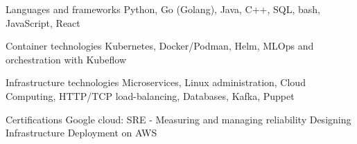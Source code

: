 \vspace{-0.5cm}

\begin{cvskills}

  \cvskill
    {Languages and frameworks} %
    {Python, Go (Golang), Java, C++, SQL, bash, JavaScript, React} %

  \cvskill
    {Container technologies} %
    {Kubernetes, Docker/Podman, Helm, MLOps and orchestration with Kubeflow} %

  \cvskill
    {Infrastructure technologies} %
    {Microservices, Linux administration, Cloud Computing, HTTP/TCP load-balancing, Databases, Kafka, Puppet} %

  \cvskill
    {Certifications} %
    { \newline Google cloud: SRE - Measuring and managing reliability \newline Designing Infrastructure Deployment on AWS} %

\end{cvskills}
